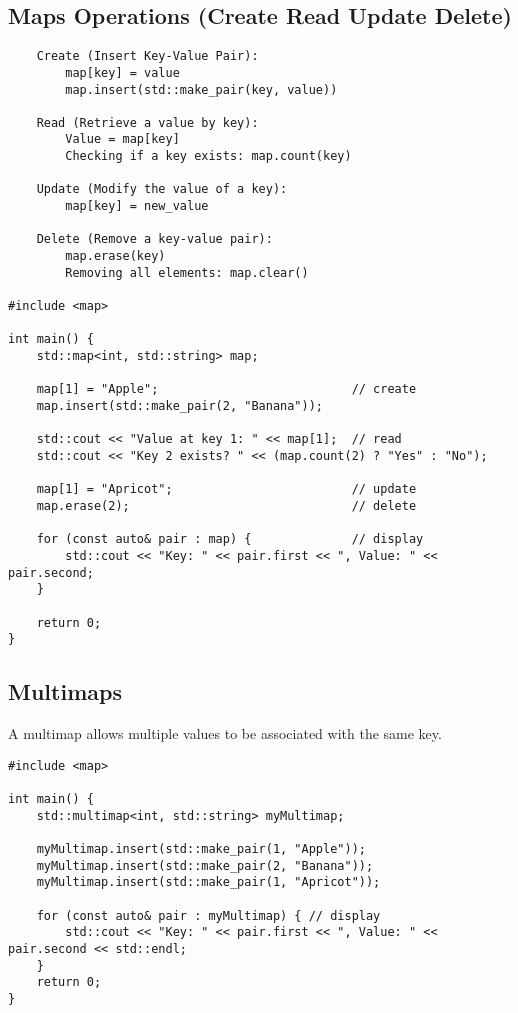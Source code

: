 \documentclass[openany]{report}
\begin{document}
 
\subsection{Maps Operations (Create Read Update Delete)}

\begin{verbatim}
    Create (Insert Key-Value Pair):
        map[key] = value 
        map.insert(std::make_pair(key, value))

    Read (Retrieve a value by key):
        Value = map[key]
        Checking if a key exists: map.count(key)

    Update (Modify the value of a key):
        map[key] = new_value

    Delete (Remove a key-value pair):
        map.erase(key)
        Removing all elements: map.clear()

#include <map>

int main() {
    std::map<int, std::string> map;

    map[1] = "Apple";                           // create
    map.insert(std::make_pair(2, "Banana"));

    std::cout << "Value at key 1: " << map[1];  // read
    std::cout << "Key 2 exists? " << (map.count(2) ? "Yes" : "No");

    map[1] = "Apricot";                         // update
    map.erase(2);                               // delete

    for (const auto& pair : map) {              // display
        std::cout << "Key: " << pair.first << ", Value: " << pair.second;
    }

    return 0;
}
\end{verbatim}

\subsection{Multimaps}

A multimap allows multiple values to be associated with the same key. 

\begin{verbatim}
#include <map>

int main() {
    std::multimap<int, std::string> myMultimap;

    myMultimap.insert(std::make_pair(1, "Apple"));
    myMultimap.insert(std::make_pair(2, "Banana"));
    myMultimap.insert(std::make_pair(1, "Apricot"));

    for (const auto& pair : myMultimap) { // display
        std::cout << "Key: " << pair.first << ", Value: " << pair.second << std::endl;
    }
    return 0;
}
\end{verbatim}
\end{document}
